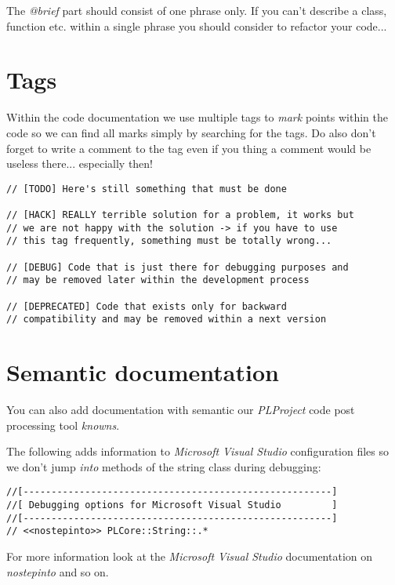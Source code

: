 The \emph{@brief} part should consist of one phrase only. If you can't describe a class, function etc. within a single phrase you should consider to refactor your code...




\section{Tags}
Within the code documentation we use multiple tags to \emph{mark} points within the code so we can find all marks simply by searching for the tags. Do also don't forget to write a comment to the tag even if you thing a comment would be useless there... especially then!

\begin{lstlisting}[caption=Comment tags]
// [TODO] Here's still something that must be done

// [HACK] REALLY terrible solution for a problem, it works but
// we are not happy with the solution -> if you have to use
// this tag frequently, something must be totally wrong...

// [DEBUG] Code that is just there for debugging purposes and
// may be removed later within the development process

// [DEPRECATED] Code that exists only for backward
// compatibility and may be removed within a next version
\end{lstlisting}




\section{Semantic documentation}
You can also add documentation with semantic our \emph{PLProject} code post processing tool \emph{knowns}.

The following adds information to \emph{Microsoft Visual Studio} configuration files so we don't jump \emph{into} methods of the string class during debugging:

\begin{lstlisting}[caption=Semantic documentation]
//[-------------------------------------------------------]
//[ Debugging options for Microsoft Visual Studio         ]
//[-------------------------------------------------------]
// <<nostepinto>> PLCore::String::.*
\end{lstlisting}

For more information look at the \emph{Microsoft Visual Studio} documentation on \emph{nostepinto} and so on.
